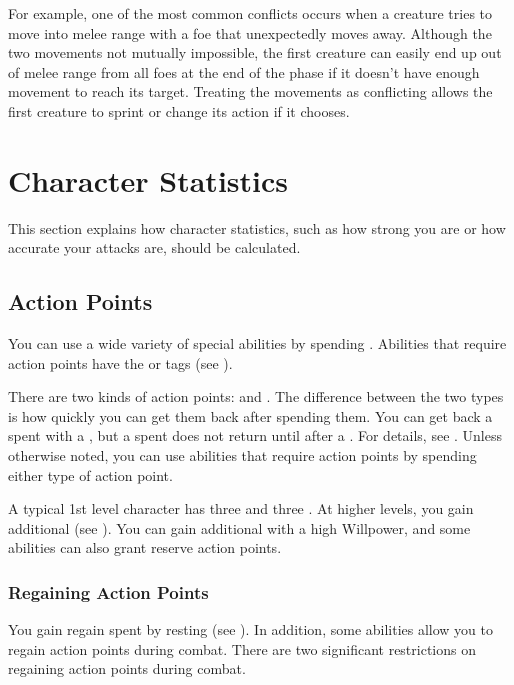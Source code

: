             For example, one of the most common conflicts occurs when a creature tries to move into melee range with a foe that unexpectedly moves away.
            Although the two movements not mutually impossible, the first creature can easily end up out of melee range from all foes at the end of the phase if it doesn't have enough movement to reach its target.
            Treating the movements as conflicting allows the first creature to sprint or change its action if it chooses.

\section{Character Statistics}
    This section explains how character statistics, such as how strong you are or how accurate your attacks are, should be calculated.

    \subsection{Action Points}\label{Action Points}
        You can use a wide variety of special abilities by spending .
        Abilities that require action points have the  or  tags (see ).

        There are two kinds of action points:  and .
        The difference between the two types is how quickly you can get them back after spending them.
        You can get back a spent  with a ,
            but a spent  does not return until after a .
        For details, see .
        Unless otherwise noted, you can use abilities that require action points by spending either type of action point.

        A typical 1st level character has three  and three .
        At higher levels, you gain additional  (see ).
        You can gain additional  with a high Willpower, and some abilities can also grant reserve action points.

        \subsubsection{Regaining Action Points}\label{Regaining Action Points}
            You gain regain spent  by resting (see ).
            In addition, some abilities allow you to regain action points during combat.
            There are two significant restrictions on regaining action points during combat.


